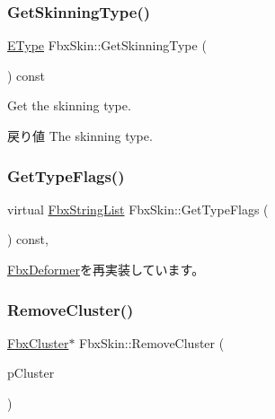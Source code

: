 \subsubsection{\texorpdfstring{Get\+Skinning\+Type()}{GetSkinningType()}}
{\footnotesize\ttfamily \hyperlink{class_fbx_skin_aee398789ebed22fa97269a26c6049a16}{E\+Type} Fbx\+Skin\+::\+Get\+Skinning\+Type (\begin{DoxyParamCaption}{ }\end{DoxyParamCaption}) const}

Get the skinning type. \begin{DoxyReturn}{戻り値}
The skinning type. 
\end{DoxyReturn}
\mbox{\label{class_fbx_skin_a736228a80b5d0db0075527767286be2d}} 
\subsubsection{\texorpdfstring{Get\+Type\+Flags()}{GetTypeFlags()}}
{\footnotesize\ttfamily virtual \hyperlink{class_fbx_string_list}{Fbx\+String\+List} Fbx\+Skin\+::\+Get\+Type\+Flags (\begin{DoxyParamCaption}{ }\end{DoxyParamCaption}) const\hspace{0.3cm}{\ttfamily [protected]}, {\ttfamily [virtual]}}



\hyperlink{class_fbx_deformer_ac3f5a3eb2dda62397fc667004d798319}{Fbx\+Deformer}を再実装しています。

\mbox{\label{class_fbx_skin_a443fa63f322e84c08714eef77107f921}} 
\subsubsection{\texorpdfstring{Remove\+Cluster()}{RemoveCluster()}}
{\footnotesize\ttfamily \hyperlink{class_fbx_cluster}{Fbx\+Cluster}$\ast$ Fbx\+Skin\+::\+Remove\+Cluster (\begin{DoxyParamCaption}\item[{\hyperlink{class_fbx_cluster}{Fbx\+Cluster} $\ast$}]{p\+Cluster }\end{DoxyParamCaption})}


